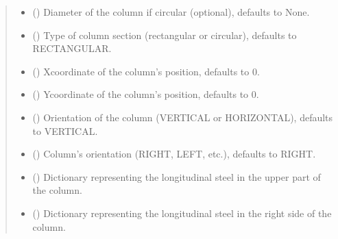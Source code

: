 \documentclass[a4paper,10pt,english]{sphinxmanual}
\begin{document}
\begin{fulllineitems}
\begin{quote}
\begin{description}
\begin{itemize}
\item {} 
\sphinxAtStartPar
{} (\sphinxstyleliteralemphasis{\sphinxupquote{, }}) \textendash{} Diameter of the column if circular (optional), defaults to None.

\item {} 
\sphinxAtStartPar
{} () \textendash{} Type of column section (rectangular or circular), defaults to RECTANGULAR.

\item {} 
\sphinxAtStartPar
{} () \textendash{} X\sphinxhyphen{}coordinate of the column’s position, defaults to 0.

\item {} 
\sphinxAtStartPar
{} () \textendash{} Y\sphinxhyphen{}coordinate of the column’s position, defaults to 0.

\item {} 
\sphinxAtStartPar
{} () \textendash{} Orientation of the column (VERTICAL or HORIZONTAL), defaults to VERTICAL.

\item {} 
\sphinxAtStartPar
{} () \textendash{} Column’s orientation (RIGHT, LEFT, etc.), defaults to RIGHT.

\item {} 
\sphinxAtStartPar
{} (\sphinxstyleliteralemphasis{\sphinxupquote{, }}) \textendash{} Dictionary representing the longitudinal steel in the upper part of the column.

\item {} 
\sphinxAtStartPar
{} (\sphinxstyleliteralemphasis{\sphinxupquote{, }}) \textendash{} Dictionary representing the longitudinal steel in the right side of the column.


\end{itemize}
\end{description}
\end{quote}
\end{fulllineitems}
\end{document}
